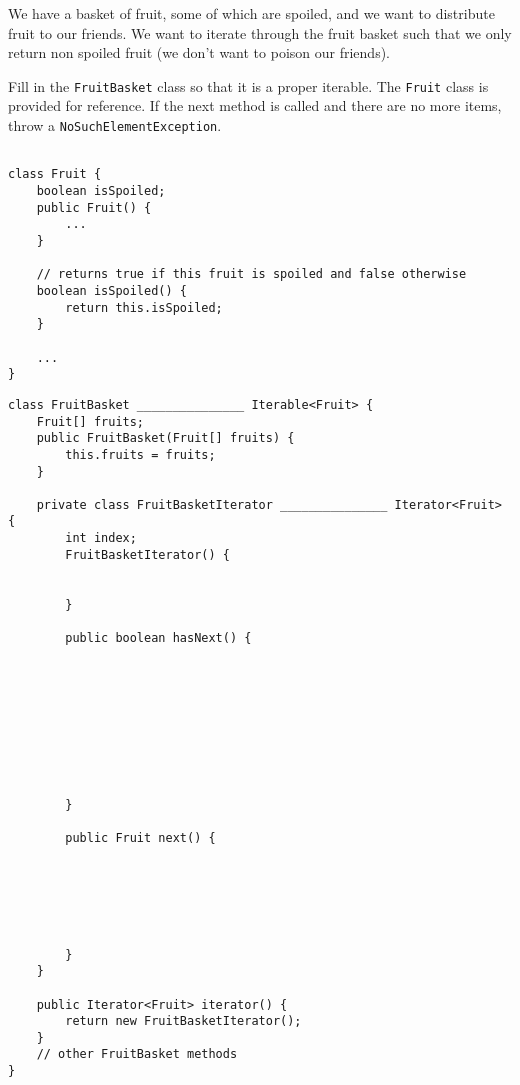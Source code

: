 \question We have a basket of fruit, some of which are spoiled, and we want to distribute fruit to our friends. We want to iterate through the fruit basket such that we only return non spoiled fruit (we don’t want to poison our friends). 

Fill in the \lstinline$FruitBasket$ class so that it is a proper iterable. The \lstinline$Fruit$ class is provided for reference. If the next method is called and there are no more items, throw a \lstinline$NoSuchElementException$.

\begin{lstlisting}

class Fruit {
    boolean isSpoiled;
    public Fruit() {
        ...
    }
    
    // returns true if this fruit is spoiled and false otherwise
    boolean isSpoiled() {
        return this.isSpoiled;
    }

    ...
}
\end{lstlisting}

\newpage
\begin{lstlisting}
class FruitBasket _______________ Iterable<Fruit> {
    Fruit[] fruits;
    public FruitBasket(Fruit[] fruits) {
        this.fruits = fruits;
    }
    
    private class FruitBasketIterator _______________ Iterator<Fruit> {
        int index;
    	FruitBasketIterator() {
    	    
    	    
        }
    
    	public boolean hasNext() {
            
            
            
            
            
            
            
            
            
        }

        public Fruit next() {
            
            
            
            
            
            
        }
    }

    public Iterator<Fruit> iterator() {
    	return new FruitBasketIterator();
    }
    // other FruitBasket methods
}
\end{lstlisting}

